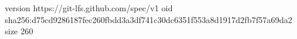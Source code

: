 version https://git-lfs.github.com/spec/v1
oid sha256:d75cd9286187fec260fbdd3a3df741c30dc6351f553a8d1917d2fb7f57a69da2
size 260
